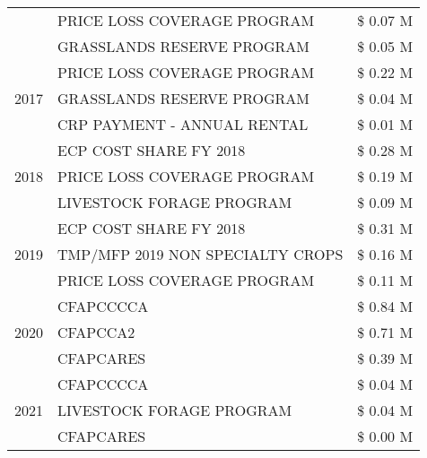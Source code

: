 \begin{tabular}{llr}
 & PRICE LOSS COVERAGE PROGRAM & \$ 0.07 M \\
 & GRASSLANDS RESERVE PROGRAM & \$ 0.05 M \\
\cline{1-3}
\multirow[t]{3}{*}{2017} & PRICE LOSS COVERAGE PROGRAM & \$ 0.22 M \\
 & GRASSLANDS RESERVE PROGRAM & \$ 0.04 M \\
 & CRP PAYMENT - ANNUAL RENTAL & \$ 0.01 M \\
\cline{1-3}
\multirow[t]{3}{*}{2018} & ECP COST SHARE FY 2018 & \$ 0.28 M \\
 & PRICE LOSS COVERAGE PROGRAM & \$ 0.19 M \\
 & LIVESTOCK FORAGE PROGRAM & \$ 0.09 M \\
\cline{1-3}
\multirow[t]{3}{*}{2019} & ECP COST SHARE FY 2018 & \$ 0.31 M \\
 & TMP/MFP 2019 NON SPECIALTY CROPS & \$ 0.16 M \\
 & PRICE LOSS COVERAGE PROGRAM & \$ 0.11 M \\
\cline{1-3}
\multirow[t]{3}{*}{2020} & CFAPCCCCA & \$ 0.84 M \\
 & CFAPCCA2 & \$ 0.71 M \\
 & CFAPCARES & \$ 0.39 M \\
\cline{1-3}
\multirow[t]{3}{*}{2021} & CFAPCCCCA & \$ 0.04 M \\
 & LIVESTOCK FORAGE PROGRAM & \$ 0.04 M \\
 & CFAPCARES & \$ 0.00 M \\
\cline{1-3}
\bottomrule
\end{tabular}
